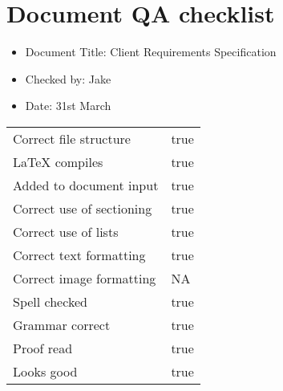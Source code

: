 \documentclass[14pt]{article}
\begin{document}
\section*{Document QA checklist}
\Large
\begin{itemize}
\item Document Title: Client Requirements Specification
\item Checked by: Jake
\item Date: 31st March
\end{itemize}
\Large
\begin{tabularx}{\textwidth}{ X | X }
Correct file structure &  true\\
\LaTeX \hspace{4pt} compiles & true\\
Added to document input & true\\
Correct use of sectioning & true\\
Correct use of lists & true\\
Correct text formatting & true\\
Correct image formatting & NA\\
Spell checked & true\\
Grammar correct & true\\
Proof read & true\\
Looks good & true\\
\end{tabularx}
\end{document}

